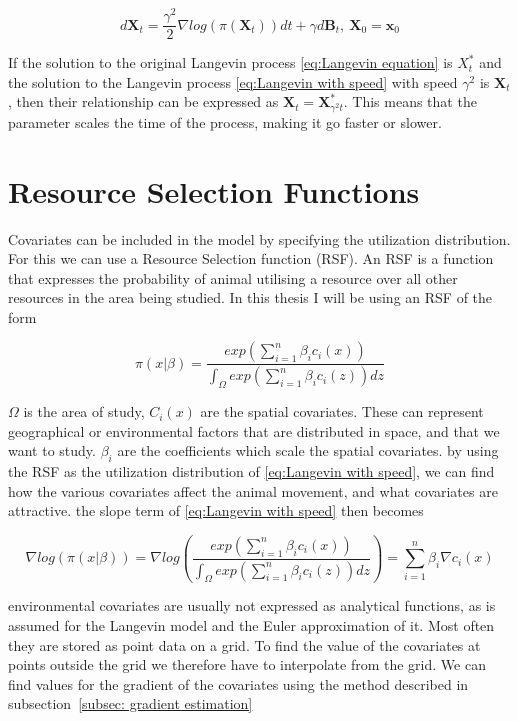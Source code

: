 \begin{equation}
    d\textbf{X}_t = \frac{\gamma^2}{2} \nabla log(\pi(\textbf{X}_t))dt + \gamma d\textbf{B}_t, \ \textbf{X}_0 = \textbf{x}_0
    \label{eq:Langevin with speed}
\end{equation}


If the solution to the original Langevin process \eqref{eq:Langevin equation} is $X^*_t$ and the solution to the Langevin process \eqref{eq:Langevin with speed} with speed $\gamma^2$ is $\textbf{X}_t$, then their relationship can be expressed as $\textbf{X}_t = \textbf{X}^*_{\gamma^2 t}$. This means that the parameter scales the time of the process, making it go faster or slower.


\section{Resource Selection Functions}

Covariates can be included in the model by specifying the utilization distribution. For this we can use a Resource Selection function (RSF). An RSF is a function that expresses the probability of animal utilising a resource over all other resources in the area being studied. In this thesis I will be using an RSF of the form


\begin{equation}
    \pi(x|\beta) = \frac{exp(\sum_{i=1}^n\beta_i c_i(x))}{\int_\Omega exp(\sum_{i=1}^n\beta_i c_i(z))dz}
    \label{eq: resource selection function}
\end{equation}

$\Omega$ is the area of study, $C_i(x)$ are the spatial covariates. These can represent geographical or environmental factors that are distributed in space, and that we want to study. $\beta_i$ are the coefficients which scale the spatial covariates. by using the RSF as the utilization distribution of \eqref{eq:Langevin with speed}, we can find how the various covariates affect the animal movement, and what covariates are attractive. the slope term of \eqref{eq:Langevin with speed} then becomes

\begin{equation}
    \nabla log(\pi(x|\beta)) = \nabla log(\frac{exp(\sum_{i=1}^n\beta_i c_i(x))}{\int_\Omega exp(\sum_{i=1}^n\beta_i c_i(z))dz}) =\sum_{i=1}^n \beta_i \nabla c_i(x)
\end{equation}



environmental covariates are usually not expressed as analytical functions, as is assumed for the Langevin model and the Euler approximation of it. Most often they are stored as point data on a grid. To find the value of the covariates at points outside the grid we therefore have to interpolate from the grid. We can find values for the gradient of the covariates using the method described in subsection~\ref{subsec: gradient estimation}


